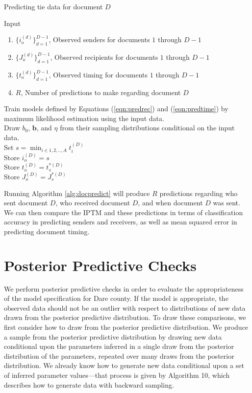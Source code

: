 \documentclass[a4paper]{article}
\begin{document}
 \begin{algorithm}[H]
	\SetAlgoLined
	\caption{Predicting tie data for document $D$}
	Input
	\begin{enumerate}
	\item $\{i_o^{(d)}\}_{d=1}^{D-1}$, Observed senders for documents $1$ through $D-1$ 
	\item $\{J_o^{(d)}\}_{d=1}^{D-1}$, Observed recipients for documents $1$ through $D-1$ 
	\item $\{t_o^{(d)}\}_{d=1}^{D-1}$, Observed timing for documents $1$ through $D-1$
	\item $R$, Number of predictions to make regarding document $D$
	\end{enumerate}
	Train models defined by Equations (\ref{eqn:predrec}) and (\ref{eqn:predtime}) by maximum likelihood estimation using the input data. \\
	 {
	Draw $b_0$, $\boldsymbol{b}$, and $\eta$ from their sampling distributions conditional on the input data.\\ 
	Set  $s = \displaystyle{\min_{i \in 1,2,..,A} } t_i^{(D)}$ \\
	Store $i_o^{(D)} = s$ \\
	Store $t_o^{(D)}= t_s^{*(D)}$ \\
	Store $J_o^{(D)}= J_s^{*(D)}$ \\
	}
	\label{alg:docpredict}
	 \end{algorithm}
	 
	 Running Algorithm \ref{alg:docpredict} will produce $R$ predictions regarding who sent document $D$, who received document $D$, and when document $D$ was sent. We can then compare the IPTM and these predictions in terms of classification accuracy in predicting senders and receivers, as well as mean squared error in predicting document timing.


\section{Posterior Predictive Checks}

We perform posterior predictive checks \cite{rubin1984bayesianly} in order to evaluate the appropriateness of the model specification for Dare county. If the model is appropriate, the observed data should not be an outlier with respect to distributions of new data drawn from the posterior predictive distribution. To draw these comparisons, we first consider how to draw from the posterior predictive distribution. We produce a sample from the posterior predictive distribution by drawing new data conditional upon the parameters inferred in a single draw from the posterior distribution of the parameters, repeated over many draws from the posterior distribution. We already know how to generate new data conditional upon a set of inferred parameter values---that process is given by Algorithm 10, which describes how to generate data with backward sampling.
\end{document}
